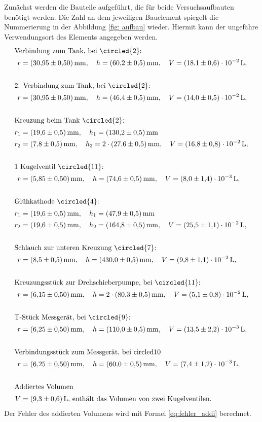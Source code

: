 Zunächst werden die Bauteile aufgeführt, die für beide Versuchsaufbauten benötigt werden.
Die Zahl an dem jeweiligen Bauelement spiegelt die Nummerierung in der Abbildung \ref{fig: aufbau} wieder.
Hiermit kann der ungefähre Verwendungsort des Elements angegeben werden.
\begin{align*}
  \shortintertext{Verbindung zum Tank, bei \circled{2}:}
  r&=\SI{30.95\pm 0.5}{\milli\meter}, \quad h=\SI{60.2\pm0.5}{\milli\meter}, \quad V=\SI{ 18.1\pm0.6 e-2}{\litre},\\
  \\
  \shortintertext{2. Verbindung zum Tank, bei  \circled{2}:}
  r&=\SI{30.95\pm 0.5}{\milli\meter}, \quad h=\SI{46.4\pm0.5}{\milli\meter}, \quad V=\SI{ 14.0\pm0.5 e-2}{\litre},\\
  \\
  \shortintertext{Kreuzung beim Tank \circled{2}:}
  r_1&=\SI{19.6\pm 0.5}{\milli\meter}, \quad h_1=\SI{130.2\pm0.5}{\milli\meter}\\
  r_2&=\SI{7.8\pm 0.5}{\milli\meter}, \quad h_2=2\cdot  \SI{27.6\pm0.5}{\milli\meter}, \quad V=\SI{ 16.8\pm0.8 e-2}{\litre},\\
  \\
  \shortintertext{1 Kugelventil \circled{11}:}
  r&=\SI{5.85\pm 0.5}{\milli\meter}, \quad h=\SI{74.6\pm0.5}{\milli\meter}, \quad V=\SI{ 8.0\pm1.4 e-3}{\litre},\\
  \\
  \shortintertext{Glühkathode \circled{4}:}
  r_1&=\SI{19.6\pm 0.5}{\milli\meter}, \quad h_1=\SI{47.9\pm0.5}{\milli\meter}\\
  r_2&=\SI{19.6\pm 0.5}{\milli\meter}, \quad h_2=\SI{164.8\pm0.5}{\milli\meter}, \quad V=\SI{ 25.5\pm1.1 e-2}{\litre},\\
  \\
  \shortintertext{Schlauch zur unteren Kreuzung \circled{7}: }
  r&=\SI{8.5\pm 0.5}{\milli\meter}, \quad h=\SI{430\pm0.5}{\milli\meter}, \quad V=\SI{ 9.8\pm1.1 e-2}{\litre},\\
  \\
  \shortintertext{Kreuzungsstück zur Drehschieberpumpe, bei \circled{11}:}
  r&=\SI{6.15\pm 0.5}{\milli\meter}, \quad h=2\cdot\SI{80.3\pm0.5}{\milli\meter}, \quad V=\SI{ 5.1\pm0.8 e-2}{\litre},\\
  \\
  \shortintertext{T-Stück Messgerät, bei \circled{9}: }
  r&=\SI{6.25\pm 0.5}{\milli\meter}, \quad h=\SI{110\pm0.5}{\milli\meter}, \quad V=\SI{ 13.5\pm2.2 e-3}{\litre},\\
  \\
  \shortintertext{Verbindungsstück zum Messgerät, bei  circled{10}}
  r&=\SI{6.25\pm 0.5}{\milli\meter}, \quad h=\SI{60\pm0.5}{\milli\meter}, \quad V=\SI{ 7.4\pm1.2 e-3}{\litre},\\
  \\
  \shortintertext{Addiertes Volumen}
  V&=\SI{ 9.3\pm0.6}{\litre},\,  \text{enthält das Volumen von zwei Kugelventilen}.
\end{align*}
Der Fehler des addierten Volumens wird mit Formel \ref{eq:fehler_addi} berechnet.

